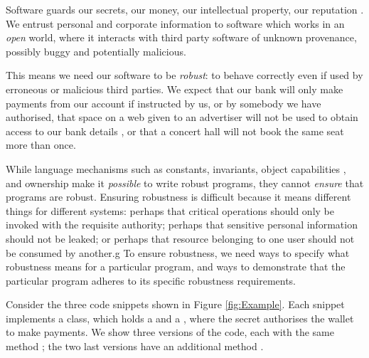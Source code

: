  Software guards our secrets, our money, our intellectual property,
our reputation \cite{covern}.  We entrust personal and
corporate information to software which works in an \emph{open} world, 
where  it interacts with 
third party software of unknown provenance, possibly buggy and potentially malicious.

This means we need our software to be \emph{robust}:
to behave correctly even if  used 
by erroneous or malicious third parties.
We expect that our bank will only make payments 
from our account if instructed by us, or by somebody we have authorised, 
that space on a web given to an advertiser will not be used
to obtain access to our bank details \cite{cwe}, or that a
concert hall will not book the same seat more than once.



While language mechanisms such as constants, invariants, 
object capabilities \cite{MillerPhD}, and 
ownership \cite{ownalias} 
make it \textit{possible} to write robust
programs, they cannot \textit{ensure} that programs are robust.
Ensuring robustness is difficult because it means 
different things for different systems: perhaps
that critical operations should only be invoked with the requisite authority;
perhaps that sensitive personal information should not be leaked; 
or perhaps that resource belonging to one user should not be consumed by another.g
%
To ensure robustness, we need ways to specify what robustness means for a 
particular program, and ways to demonstrate that the particular program 
adheres to its specific robustness requirements.


Consider the three code snippets shown in Figure \ref{fig:Example}.
Each snippet implements a 
 class, which holds a  and a ,
where the secret authorises the wallet to
 make payments. 
 We show three versions of the code, each with the same method ; the two last versions
 have an additional method .


